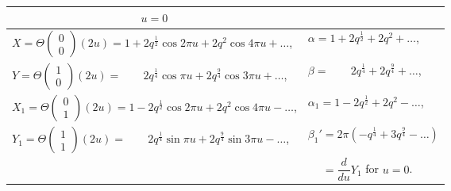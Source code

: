 \documentclass[12pt,a4paper]{article}
\theoremstyle{definition}
\begin{document}
\begin{center}
\small
\begin{tabular}{l|l}
\multicolumn{1}{c|}{$u = 0$} & \\
\hline
$X = \Theta\begin{pmatrix} 0 \\ 0 \end{pmatrix}(2u) = 1 + 2q^{\frac{1}{2}}\cos 2\pi u + 2q^2\cos 4\pi u + \dots$, & $\alpha = 1 + 2q^{\frac{1}{2}} + 2q^2 + \dots$, \\
$Y = \Theta\begin{pmatrix} 1 \\ 0 \end{pmatrix}(2u) = \phantom{1 +}\ 2q^{\frac{1}{4}}\cos\pi u + 2q^{\frac{9}{4}}\cos 3\pi u + \dots$, & $\beta = \phantom{1 +}\ 2q^{\frac{1}{4}} + 2q^{\frac{9}{4}} + \dots$, \\
$X_1 = \Theta\begin{pmatrix} 0 \\ 1 \end{pmatrix}(2u) = 1 - 2q^{\frac{1}{2}}\cos 2\pi u + 2q^2\cos 4\pi u - \dots$, & $\alpha_1 = 1 - 2q^{\frac{1}{2}} + 2q^2 - \dots$, \\
$Y_1 = \Theta\begin{pmatrix} 1 \\ 1 \end{pmatrix}(2u) = \phantom{1 +}\ 2q^{\frac{1}{4}}\sin\pi u + 2q^{\frac{9}{4}}\sin 3\pi u - \dots$, & $\beta_1' = 2\pi(-q^{\frac{1}{4}} + 3q^{\frac{9}{4}} - \dots)$ \\
 & $\phantom{\beta_1'} = \dfrac{d}{du}Y_1$ for $u = 0$.
\end{tabular}
\end{center}
\end{document}
